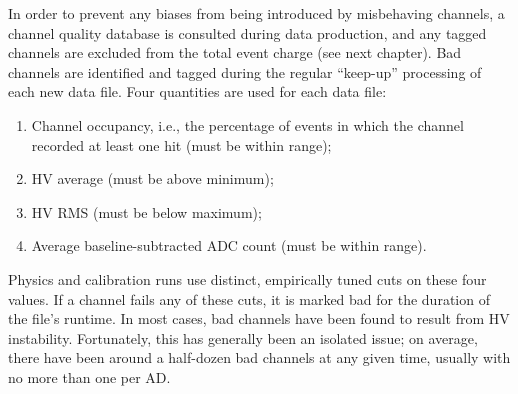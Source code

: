 \documentclass[../thesis.tex]{subfiles}
\begin{document}
In order to prevent any biases from being introduced by misbehaving channels, a
channel quality database is consulted during data production, and any tagged
channels are excluded from the total event charge (see next chapter). Bad
channels are identified and tagged during the regular ``keep-up'' processing of
each new data file. Four quantities are used for each data file:

\begin{enumerate}
\item Channel occupancy, i.e., the percentage of events in which the channel
  recorded at least one hit (must be within range);
\item HV average (must be above minimum);
\item HV RMS (must be below maximum);
\item Average baseline-subtracted ADC count (must be within range).
\end{enumerate}

Physics and calibration runs use distinct, empirically tuned cuts on these four
values. If a channel fails any of these cuts, it is marked bad for the duration
of the file's runtime. In most cases, bad channels have been found to result
from HV instability. Fortunately, this has generally been an isolated issue; on
average, there have been around a half-dozen bad channels at any given time,
usually with no more than one per AD.

\subfilebackmatter
\end{document}
